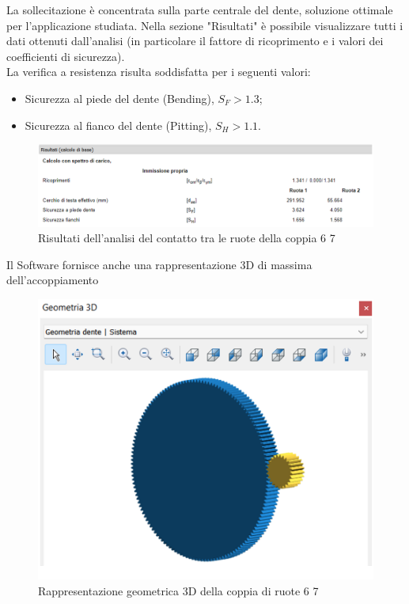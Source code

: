 La sollecitazione è concentrata sulla parte centrale del dente, soluzione ottimale per l’applicazione studiata. 
\newpage
Nella sezione "Risultati" è possibile visualizzare tutti i dati ottenuti dall’analisi (in particolare il fattore di ricoprimento e i valori dei coefficienti di sicurezza). \\
La verifica a resistenza risulta soddisfatta per i seguenti valori:
\begin{itemize}
    \item Sicurezza al piede del dente (Bending), $S_F>1.3$;
    \item Sicurezza al fianco del dente (Pitting), $S_H>1.1$.
    \end{itemize}
\begin{figure}[h]
    \centering
    \includegraphics[scale=0.6]{Immagini/RisultatiCoppia67.png}
    \caption{Risultati dell'analisi del contatto tra le ruote della coppia 6 7}
    \label{fig:RisultatiCoppia67}
\end{figure}

Il Software fornisce anche una rappresentazione 3D di massima dell’accoppiamento
\begin{figure}[h]
    \centering
    \includegraphics[scale=0.5]{Immagini/GeometriaCoppia67.png}
    \caption{Rappresentazione geometrica 3D della coppia di ruote 6 7}
    \label{fig:GeometriaCoppia67}
\end{figure}
